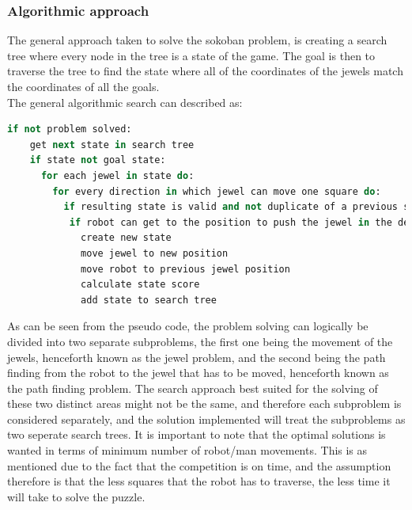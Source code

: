 \subsubsection{Algorithmic approach}
The general approach taken to solve the sokoban problem, is creating a search tree where every node in the tree is a state of the game. The goal is then to traverse the tree to find the state where all of the coordinates of the jewels match the coordinates of all the goals.\\
The general algorithmic search can described as:

\begin{lstlisting}[language=Ruby, frame=single, basicstyle=\tiny, caption={Deadlock detection pseudo code}, label={code:sokoalgo}]
if not problem solved:
	get next state in search tree
	if state not goal state:
	  for each jewel in state do:
	    for every direction in which jewel can move one square do:
		  if resulting state is valid and not duplicate of a previous state:
		   if robot can get to the position to push the jewel in the desired direction:
             create new state				
			 move jewel to new position
			 move robot to previous jewel position
			 calculate state score
			 add state to search tree	
\end{lstlisting}

As can be seen from the pseudo code, the problem solving can logically be divided into two separate subproblems, the first one being the movement of the jewels, henceforth known as the jewel problem, and the second being the path finding from the robot to the jewel that has to be moved, henceforth known as the path finding problem. 
The search approach best suited for the solving of these two distinct areas might not be the same, and therefore each subproblem is considered separately, and the solution implemented will treat the subproblems as two seperate search trees. 
It is important to note that the optimal solutions is wanted in terms of minimum number of robot/man movements. This is as mentioned due to the fact that the competition is on time, and the assumption therefore is that the less squares that the robot has to traverse, the less time it will take to solve the puzzle.